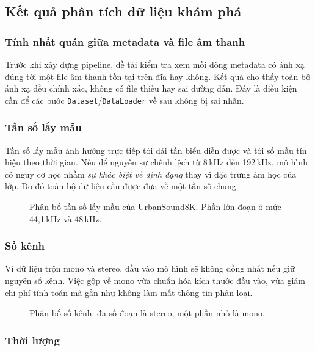 \subsection{Kết quả phân tích dữ liệu khám phá}

\subsubsection{Tính nhất quán giữa metadata và file âm thanh}

Trước khi xây dựng pipeline, đề tài kiểm tra xem mỗi dòng metadata có ánh xạ đúng
tới một file âm thanh tồn tại trên đĩa hay không. Kết quả cho thấy toàn bộ ánh xạ
đều chính xác, không có file thiếu hay sai đường dẫn. Đây là điều kiện cần để các
bước \texttt{Dataset}/\texttt{DataLoader} về sau không bị sai nhãn.

\subsubsection{Tần số lấy mẫu}

Tần số lấy mẫu ảnh hưởng trực tiếp tới dải tần biểu diễn được và tới số mẫu tín
hiệu theo thời gian. Nếu để nguyên sự chênh lệch từ 8\,kHz đến 192\,kHz, mô hình
có nguy cơ học nhầm \textit{sự khác biệt về định dạng} thay vì đặc trưng âm học
của lớp. Do đó toàn bộ dữ liệu cần được đưa về một tần số chung.

\begin{figure}[H]
  \centering
  \caption{Phân bố tần số lấy mẫu của UrbanSound8K. Phần lớn đoạn ở mức
           44{,}1\,kHz và 48\,kHz.}
  \label{fig:sr}
\end{figure}

\subsubsection{Số kênh}

Vì dữ liệu trộn mono và stereo, đầu vào mô hình sẽ không đồng nhất nếu giữ nguyên
số kênh. Việc gộp về mono vừa chuẩn hóa kích thước đầu vào, vừa giảm chi phí tính
toán mà gần như không làm mất thông tin phân loại.

\begin{figure}[H]
  \centering
  \caption{Phân bố số kênh: đa số đoạn là stereo, một phần nhỏ là mono.}
  \label{fig:ch}
\end{figure}

\subsubsection{Thời lượng}

